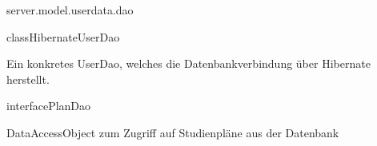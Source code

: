 \begin{texdocpackage}{server.model.userdata.dao}
\begin{texdocclass}{class}{HibernateUserDao}
\label{texdoclet:edu.kit.informatik.studyplan.server.model.userdata.dao.HibernateUserDao}
\begin{texdocclassintro}
Ein konkretes UserDao, welches die Datenbankverbindung über Hibernate herstellt.\end{texdocclassintro}
\begin{texdocclassconstructors}
\end{texdocclassconstructors}
\begin{texdocclassmethods}
\end{texdocclassmethods}
\end{texdocclass}


\begin{texdocclass}{interface}{PlanDao}
\label{texdoclet:edu.kit.informatik.studyplan.server.model.userdata.dao.PlanDao}
\begin{texdocclassintro}
DataAccessObject zum Zugriff auf Studienpläne aus der Datenbank\end{texdocclassintro}
\begin{texdocclassmethods}
\end{texdocclassmethods}
\end{texdocclass}



\end{texdocpackage}
